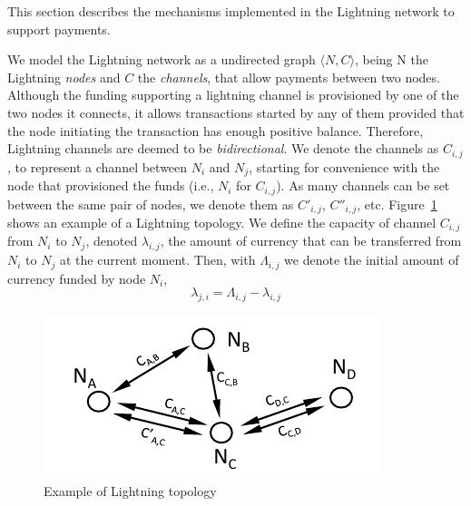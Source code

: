 This section describes the mechanisms implemented in the Lightning network to support payments.

We model the Lightning network as a undirected graph $\langle N,C \rangle$, being N the Lightning \textit{nodes} and $C$ the \textit{channels}, that allow payments between two nodes.
Although the funding supporting a lightning channel is provisioned by one of the two nodes it connects,
it allows transactions started by any of them provided that the node initiating the transaction has enough positive balance. 
Therefore, Lightning channels are deemed to be \textit{bidirectional}.
We denote the channels as $C_{i,j}$, to represent a channel between $N_i$ and $N_j$, 
starting for convenience with the node that provisioned the funds (i.e., $N_{i}$ for $C_{i,j}$). 
As many channels can be set between the same pair of nodes, we denote them as $C'_{i,j}$, $C''_{i,j}$, etc.
Figure~\ref{fig:lightning-topology} shows an example of a Lightning topology.
We define the capacity of channel $C_{i,j}$ from $N_i$ to $N_j$, denoted $\lambda_{i,j}$, 
the amount of currency that can be transferred from $N_i$ to $N_j$ at the current moment. 
Then, with $\Lambda_{i,j}$ we denote the initial amount of currency funded by node $N_i$,
\begin{equation}
    \lambda_{j,i} = \Lambda_{i,j} - \lambda_{i,j}
\end{equation}

\begin{figure}[h!]
    \centering
    \includegraphics[width=0.95\linewidth]{img/lightning-topology.pdf}
    \caption{Example of Lightning topology}
    \label{fig:lightning-topology}
\end{figure}

